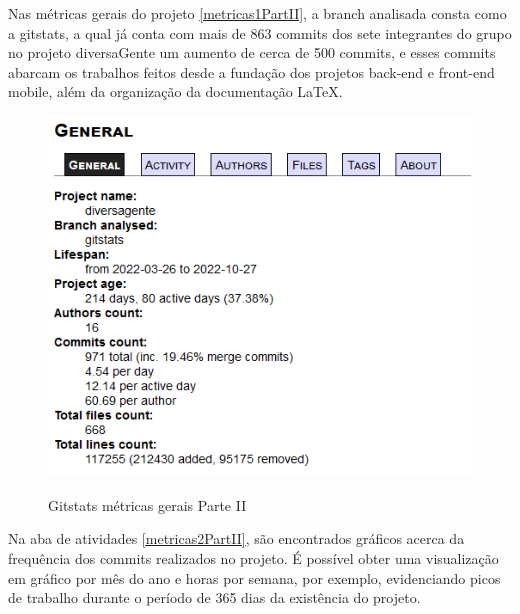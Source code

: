 Nas métricas gerais do projeto \autoref{metricas1PartII}, a branch analisada consta como a gitstats, a qual já conta com mais de 863 commits dos sete integrantes do grupo no projeto diversaGente um aumento de cerca de 500 commits, e esses commits abarcam os trabalhos feitos desde a fundação dos projetos back-end e front-end mobile, além da organização da documentação LaTeX. 

\begin{figure}[htb]
	\centering
	\caption{\label{fig_arq_virado}Gitstats métricas gerais Parte II}
	\includegraphics[width=1.00\textwidth]{anexos/metricas1PartII.png}
	\label{metricas1PartII}
\end{figure}

\pagebreak

\begin{itemize}

\end{itemize}

Na aba de atividades \autoref{metricas2PartII}, são encontrados gráficos acerca da frequência dos commits realizados no projeto. É possível obter uma visualização em gráfico por mês do ano e horas por semana, por exemplo, evidenciando picos de trabalho durante o período de 365 dias da existência do projeto.

